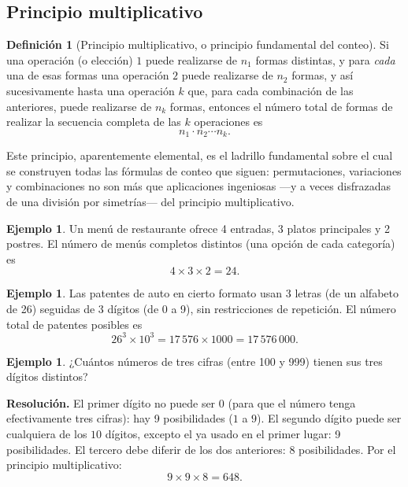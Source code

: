 \documentclass[11pt,a4paper]{article}
\theoremstyle{plain}
\theoremstyle{definition}
\newtheorem{definicion}[teorema]{Definición}
\newtheorem{ejemplo}[teorema]{Ejemplo}
\theoremstyle{remark}
\begin{document}
\subsection{Principio multiplicativo}

\begin{definicion}[Principio multiplicativo, o principio fundamental del conteo]
Si una operación (o elección) $1$ puede realizarse de $n_1$ formas distintas, y para \emph{cada} una de esas formas una operación $2$ puede realizarse de $n_2$ formas, y así sucesivamente hasta una operación $k$ que, para cada combinación de las anteriores, puede realizarse de $n_k$ formas, entonces el número total de formas de realizar la secuencia completa de las $k$ operaciones es
\[
n_1 \cdot n_2 \cdots n_k.
\]
\end{definicion}

Este principio, aparentemente elemental, es el ladrillo fundamental sobre el cual se construyen todas las fórmulas de conteo que siguen: permutaciones, variaciones y combinaciones no son más que aplicaciones ingeniosas —y a veces disfrazadas de una división por simetrías— del principio multiplicativo.

\begin{ejemplo}
Un menú de restaurante ofrece 4 entradas, 3 platos principales y 2 postres. El número de menús completos distintos (una opción de cada categoría) es
\[
4 \times 3 \times 2 = 24.
\]
\end{ejemplo}

\begin{ejemplo}
Las patentes de auto en cierto formato usan 3 letras (de un alfabeto de 26) seguidas de 3 dígitos (de 0 a 9), sin restricciones de repetición. El número total de patentes posibles es
\[
26^3 \times 10^3 = 17\,576 \times 1000 = 17\,576\,000.
\]
\end{ejemplo}

\begin{ejemplo}
¿Cuántos números de tres cifras (entre 100 y 999) tienen sus tres dígitos distintos?
\end{ejemplo}

\textbf{Resolución.} El primer dígito no puede ser $0$ (para que el número tenga efectivamente tres cifras): hay 9 posibilidades ($1$ a $9$). El segundo dígito puede ser cualquiera de los $10$ dígitos, excepto el ya usado en el primer lugar: 9 posibilidades. El tercero debe diferir de los dos anteriores: 8 posibilidades. Por el principio multiplicativo:
\[
9\times 9 \times 8 = 648.
\]
\end{document}
